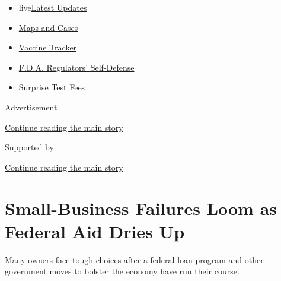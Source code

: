 \begin{itemize}
\tightlist
\item
  live\href{https://www.nytimes3xbfgragh.onion/2020/09/12/world/covid-19-coronavirus.html?name=styln-coronavirus-markets\&region=TOP_BANNER\&block=storyline_menu_recirc\&action=click\&pgtype=Article\&impression_id=bad28bd1-f52f-11ea-ae45-8f05135d08e7\&variant=undefined}{Latest
  Updates}
\item
  \href{https://www.nytimes3xbfgragh.onion/interactive/2020/us/coronavirus-us-cases.html?name=styln-coronavirus-markets\&region=TOP_BANNER\&block=storyline_menu_recirc\&action=click\&pgtype=Article\&impression_id=bad2b2e0-f52f-11ea-ae45-8f05135d08e7\&variant=undefined}{Maps
  and Cases}
\item
  \href{https://www.nytimes3xbfgragh.onion/interactive/2020/science/coronavirus-vaccine-tracker.html?name=styln-coronavirus-markets\&region=TOP_BANNER\&block=storyline_menu_recirc\&action=click\&pgtype=Article\&impression_id=bad2b2e1-f52f-11ea-ae45-8f05135d08e7\&variant=undefined}{Vaccine
  Tracker}
\item
  \href{https://www.nytimes3xbfgragh.onion/2020/09/10/us/politics/fda-coronavirus-vaccine.html?name=styln-coronavirus-markets\&region=TOP_BANNER\&block=storyline_menu_recirc\&action=click\&pgtype=Article\&impression_id=bad2b2e2-f52f-11ea-ae45-8f05135d08e7\&variant=undefined}{F.D.A.
  Regulators' Self-Defense}
\item
  \href{https://www.nytimes3xbfgragh.onion/2020/09/09/upshot/coronavirus-surprise-test-fees.html?name=styln-coronavirus-markets\&region=TOP_BANNER\&block=storyline_menu_recirc\&action=click\&pgtype=Article\&impression_id=bad2b2e3-f52f-11ea-ae45-8f05135d08e7\&variant=undefined}{Surprise
  Test Fees}
\end{itemize}

Advertisement

\protect\hyperlink{after-top}{Continue reading the main story}

Supported by

\protect\hyperlink{after-sponsor}{Continue reading the main story}

\hypertarget{small-business-failures-loom-as-federal-aid-dries-up}{%
\section{Small-Business Failures Loom as Federal Aid Dries
Up}\label{small-business-failures-loom-as-federal-aid-dries-up}}

Many owners face tough choices after a federal loan program and other
government moves to bolster the economy have run their course.


